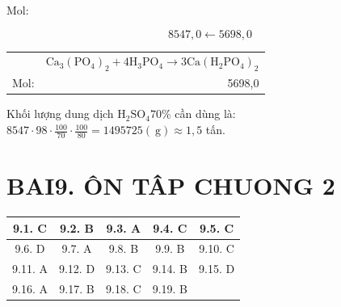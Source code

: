 \documentclass[10pt]{article}
\begin{document}
Mol:

$$
8547,0 \leftarrow 5698,0
$$

\begin{center}
\begin{tabular}{rr}
 & $\mathrm{Ca}_{3}\left(\mathrm{PO}_{4}\right)_{2}+4 \mathrm{H}_{3} \mathrm{PO}_{4} \longrightarrow 3 \mathrm{Ca}\left(\mathrm{H}_{2} \mathrm{PO}_{4}\right)_{2}$ \\
Mol: & 5698,0 \\
\end{tabular}
\end{center}

Khối lượng dung dịch $\mathrm{H}_{2} \mathrm{SO}_{4} 70 \%$ cần dùng là:\\
$8547 \cdot 98 \cdot \frac{100}{70} \cdot \frac{100}{80}=1495725(\mathrm{~g}) \approx 1,5$ tấn.

\section*{BAI9. ÔN TÂP CHUONG 2}
\begin{center}
\begin{tabular}{|c|c|c|c|c|}
\hline
9.1. C & 9.2. B & 9.3. A & 9.4. C & 9.5. C \\
\hline
9.6. D & 9.7. A & 9.8. B & 9.9. B & 9.10. C \\
\hline
9.11. A & 9.12. D & 9.13. C & 9.14. B & 9.15. D \\
\hline
9.16. A & 9.17. B & 9.18. C & 9.19. B &  \\
\hline
\end{tabular}
\end{center}
\end{document}
